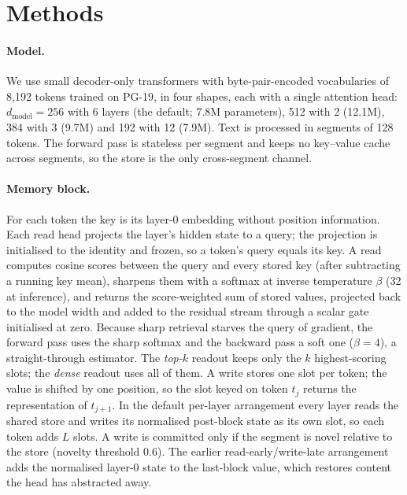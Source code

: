 \section*{Methods}

\paragraph{Model.} We use small decoder-only transformers with byte-pair-encoded
vocabularies of 8,192 tokens trained on PG-19\cite{rae2020compressive}, in four shapes, each
with a single attention head: $d_\text{model}=256$ with 6 layers (the default; 7.8M parameters),
512 with 2 (12.1M), 384 with 3 (9.7M) and 192 with 12 (7.9M). Text is processed in segments of 128
tokens. The forward pass is stateless per segment and keeps no key--value cache across
segments, so the store is the only cross-segment channel.

\paragraph{Memory block.} For each token the key is its layer-0 embedding without position
information. Each read head projects the layer's hidden state to a query; the projection is
initialised to the identity and frozen, so a token's query equals its key. A read computes
cosine scores between the query and every stored key (after subtracting a running key mean),
sharpens them with a softmax at inverse temperature $\beta$ (32 at inference), and returns the
score-weighted sum of stored values, projected back to the model width and added to the
residual stream through a scalar gate initialised at zero\cite{bachlechner2021rezero}.
Because sharp retrieval starves the query of gradient, the forward pass uses the sharp
softmax and the backward pass a soft one ($\beta=4$), a straight-through
estimator\cite{bengio2013ste}. The \emph{top-$k$} readout keeps only the $k$ highest-scoring
slots; the \emph{dense} readout uses all of them. A write stores one slot per token; the value
is shifted by one position, so the slot keyed on token $t_j$ returns the representation of
$t_{j+1}$. In the default per-layer arrangement every layer reads the shared store and writes
its normalised post-block state as its own slot, so each token adds $L$ slots. A write is
committed only if the segment is novel relative to the store (novelty threshold 0.6). The
earlier read-early/write-late arrangement adds the normalised layer-0 state to the
last-block value, which restores content the head has abstracted away.

